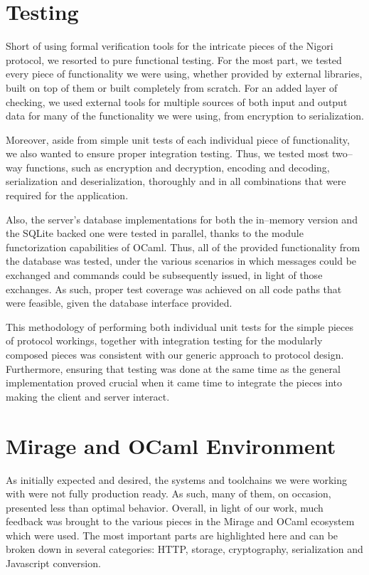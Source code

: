 \section{Testing}
Short of using formal verification tools for the intricate pieces of the Nigori protocol, we resorted to pure functional testing.
For the most part, we tested every piece of functionality we were using, whether provided by external libraries, built on top of them or built completely from scratch.
For an added layer of checking, we used external tools for multiple sources of both input and output data for many of the functionality we were using, from encryption to serialization.

Moreover, aside from simple unit tests of each individual piece of functionality, we also wanted to ensure proper integration testing.
Thus, we tested most two--way functions, such as encryption and decryption, encoding and decoding, serialization and deserialization, thoroughly and in all combinations that were required for the application.

Also, the server's database implementations for both the in--memory version and the SQLite backed one were tested in parallel, thanks to the module functorization capabilities of OCaml.
Thus, all of the provided functionality from the database was tested, under the various scenarios in which messages could be exchanged and commands could be subsequently issued, in light of those exchanges.
As such, proper test coverage was achieved on all code paths that were feasible, given the database interface provided.

This methodology of performing both individual unit tests for the simple pieces of protocol workings, together with integration testing for the modularly composed pieces was consistent with our generic approach to protocol design.
Furthermore, ensuring that testing was done at the same time as the general implementation proved crucial when it came time to integrate the pieces into making the client and server interact.

\section{Mirage and OCaml Environment}
As initially expected and desired, the systems and toolchains we were working with were not fully production ready.
As such, many of them, on occasion, presented less than optimal behavior.
Overall, in light of our work, much feedback was brought to the various pieces in the Mirage and OCaml ecosystem which were used.
The most important parts are highlighted here and can be broken down in several categories: HTTP, storage, cryptography, serialization and Javascript conversion.

